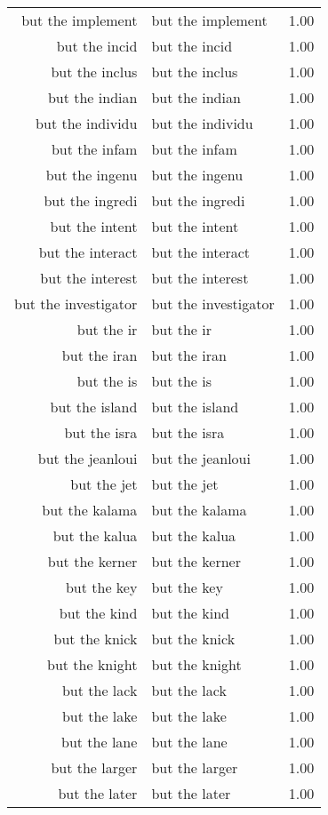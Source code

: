 \begin{table}[ht]
\begin{tabular}{rlr}
  but the implement & but the implement & 1.00 \\ 
  but the incid & but the incid & 1.00 \\ 
  but the inclus & but the inclus & 1.00 \\ 
  but the indian & but the indian & 1.00 \\ 
  but the individu & but the individu & 1.00 \\ 
  but the infam & but the infam & 1.00 \\ 
  but the ingenu & but the ingenu & 1.00 \\ 
  but the ingredi & but the ingredi & 1.00 \\ 
  but the intent & but the intent & 1.00 \\ 
  but the interact & but the interact & 1.00 \\ 
  but the interest & but the interest & 1.00 \\ 
  but the investigator & but the investigator & 1.00 \\ 
  but the ir & but the ir & 1.00 \\ 
  but the iran & but the iran & 1.00 \\ 
  but the is & but the is & 1.00 \\ 
  but the island & but the island & 1.00 \\ 
  but the isra & but the isra & 1.00 \\ 
  but the jeanloui & but the jeanloui & 1.00 \\ 
  but the jet & but the jet & 1.00 \\ 
  but the kalama & but the kalama & 1.00 \\ 
  but the kalua & but the kalua & 1.00 \\ 
  but the kerner & but the kerner & 1.00 \\ 
  but the key & but the key & 1.00 \\ 
  but the kind & but the kind & 1.00 \\ 
  but the knick & but the knick & 1.00 \\ 
  but the knight & but the knight & 1.00 \\ 
  but the lack & but the lack & 1.00 \\ 
  but the lake & but the lake & 1.00 \\ 
  but the lane & but the lane & 1.00 \\ 
  but the larger & but the larger & 1.00 \\ 
  but the later & but the later & 1.00 \\ 

\end{tabular}
\end{table}
